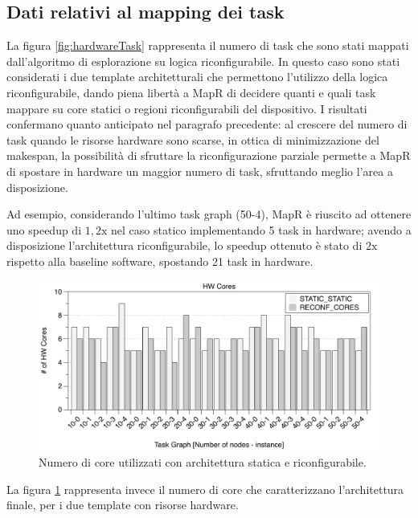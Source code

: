 \subsection{Dati relativi al mapping dei task}
La figura \ref{fig:hardwareTask} rappresenta il numero di task che sono stati mappati
dall'algoritmo di esplorazione su logica riconfigurabile.
In questo caso sono stati considerati i due template architetturali che permettono
l'utilizzo della logica riconfigurabile, dando piena libert\`a
a MapR di decidere quanti e quali task mappare su core statici o regioni riconfigurabili del dispositivo.
I risultati confermano quanto anticipato nel paragrafo precedente: al crescere del numero di
task quando le risorse hardware sono scarse, in ottica di minimizzazione del makespan, la possibilit\`a di sfruttare
la riconfigurazione parziale permette a MapR di spostare
in hardware un maggior numero di task, sfruttando meglio l'area a disposizione.

Ad esempio, considerando l'ultimo task graph (50-4), MapR \`e riuscito ad ottenere uno speedup di
$1,2\text{x}$ nel caso statico implementando 5 task in hardware; avendo a disposizione l'architettura
riconfigurabile, lo speedup ottenuto \`e stato di $2\text{x}$ rispetto alla baseline software,
spostando 21 task in hardware.

\begin{figure}[t]
 \begin{center}
  \includegraphics[width=\textwidth]{./capitoli/figure/cap6/FPL_HWcores.pdf}
  \caption{Numero di core utilizzati con architettura statica e riconfigurabile.}
  \label{fig:coreUtilizzati}
 \end{center}
\end{figure}

La figura \ref{fig:coreUtilizzati} rappresenta invece il numero di core che caratterizzano
l'architettura finale, per i due template con risorse hardware.

